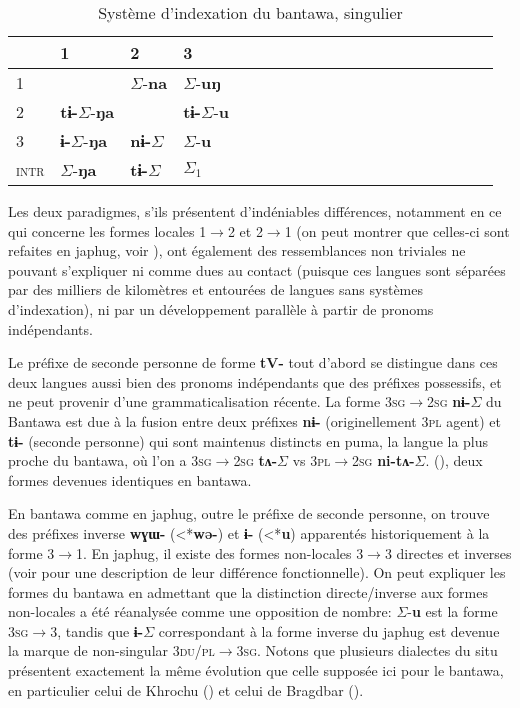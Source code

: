 \documentclass[oldfontcommands,oneside,a4paper,11pt]{article}
\newcommand{\ipa}[1]{{\phon\textbf{\mbox{#1}}}} %
\newcommand{\grise}[1]{\cellcolor{lightgray}\textbf{#1}}
\newcommand{\ra}{$\Sigma_1$}
\newcommand{\ro}{$\Sigma$}
\begin{document}
\begin{table}[H]
\caption{Système d'indexation du bantawa, singulier} \centering \label{tab:bantawa}
\begin{tabular}{l|lllllllllllllllllll}
\toprule
&1 & 2 &3 &\\
\midrule
1 &\grise{}& \ro{}-\ipa{na} & \ro{}-\ipa{uŋ}	 \\
2 &\ipa{tɨ-}\ro{}-\ipa{ŋa} &\grise{} &\ipa{tɨ-}\ro{}-\ipa{u}\\
3 &\ipa{ɨ-}\ro{}-\ipa{ŋa}&\ipa{nɨ-}\ro{}& \ro{}-\ipa{u}\\
\midrule
\textsc{intr} & \ro{}-\ipa{ŋa}&\ipa{tɨ-}\ro{}&\ra{} \\
\bottomrule
\end{tabular}
\end{table}

Les deux paradigmes, s'ils présentent d'indéniables différences, notamment en ce qui concerne les formes locales 1$\rightarrow$2 et 2$\rightarrow$1 (on peut montrer que celles-ci sont refaites en japhug, voir \citealt{jacques15generic}), ont également des ressemblances non triviales ne pouvant s'expliquer ni comme dues au contact (puisque ces langues sont séparées par des milliers de kilomètres et entourées de langues sans systèmes d'indexation), ni par un développement parallèle à partir de pronoms indépendants.

Le préfixe de seconde personne de forme \ipa{tV-} tout d'abord se distingue dans ces deux langues aussi bien des pronoms indépendants que des préfixes possessifs, et ne peut provenir d'une grammaticalisation récente. La forme \textsc{3sg$\rightarrow$2sg} \ipa{nɨ-}\ro{} du Bantawa est due à la fusion entre deux préfixes \ipa{nɨ-} (originellement \textsc{3pl} agent)  et \ipa{tɨ-} (seconde personne) qui sont maintenus distincts en puma, la langue la plus proche du bantawa, où l'on a \textsc{3sg$\rightarrow$2sg} \ipa{tʌ-}\ro{} vs \textsc{3pl$\rightarrow$2sg} \ipa{ni-tʌ-}\ro{}. (\citealt{bickel07puma}), deux formes devenues identiques en bantawa.

En bantawa comme en japhug, outre le préfixe de seconde personne, on trouve des préfixes  inverse \ipa{wɣɯ-} (<*\ipa{wə-}) et \ipa{ɨ-} (<*\ipa{u}) apparentés historiquement à la forme \textsc{3$\rightarrow$1}. En japhug, il existe des formes non-locales 3$\rightarrow$3 directes et inverses (voir  \citealt{jacques10inverse} pour une description de leur différence fonctionnelle). On peut expliquer les formes du bantawa en admettant que la distinction directe/inverse aux formes non-locales a été réanalysée comme une opposition de nombre:  \ro{}-\ipa{u} est la forme \textsc{3sg$\rightarrow$3}, tandis que  \ipa{ɨ-}\ro{} correspondant à la forme inverse du japhug est devenue la marque de non-singular \textsc{3du/pl$\rightarrow$3sg}. Notons que plusieurs dialectes du situ présentent exactement la même évolution que celle supposée ici pour le bantawa, en particulier celui de Khrochu (\citealt{jackson15sastod}) et celui de Bragdbar (\citealt{zhangsy17obviative}).
\end{document}
